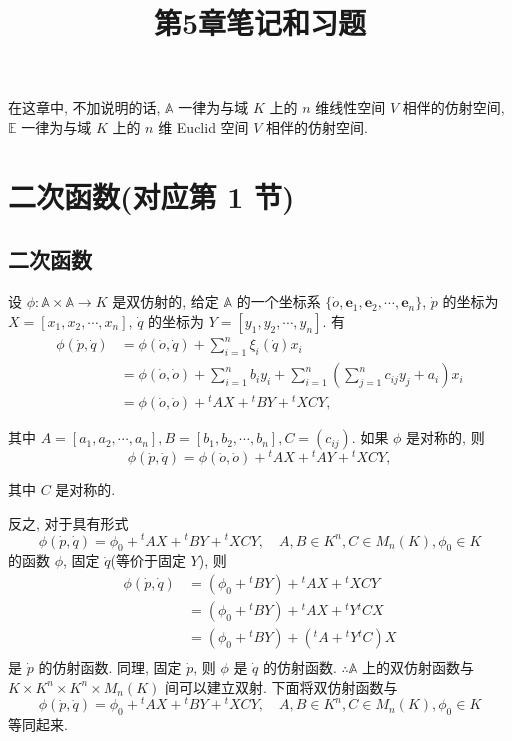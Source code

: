 \documentclass{ctexart}
\title{第5章笔记和习题}
\begin{document}
\maketitle
在这章中, 不加说明的话, $\mathbb{A}$ 一律为与域 $K$ 上的 $n$ 维线性空间 $V$ 相伴的仿射空间, $\mathbb{E}$ 一律为与域 $K$ 上的 $n$ 维 Euclid 空间 $V$ 相伴的仿射空间.
\section{二次函数(对应第 1 节)}
\subsection{二次函数}
设 $\phi:\mathbb{A}\times\mathbb{A}\to K$ 是双仿射的, 给定 $\mathbb{A}$ 的一个坐标系 $\{\dot{o},\boldsymbol{e}_1,\boldsymbol{e}_2,\cdots,\boldsymbol{e}_n\}$, $\dot{p}$ 的坐标为 $X=[x_1,x_2,\cdots,x_n]$, $\dot{q}$ 的坐标为 $Y=[y_1,y_2,\cdots,y_n]$. 有
\begin{align*}
    \phi(\dot{p},\dot{q}) & =\phi(\dot{o},\dot{q})+\sum\limits_{i=1}^n\xi_i(\dot{q})x_i \\
    & =\phi(\dot{o},\dot{o})+\sum\limits_{i=1}^nb_iy_i+\sum\limits_{i=1}^n\left(\sum\limits_{j=1}^nc_{ij}y_j+a_i\right)x_i \\
    & =\phi(\dot{o},\dot{o})+{}^tAX+{}^tBY+{}^tXCY,
\end{align*}

其中 $A=[a_1,a_2,\cdots,a_n],B=[b_1,b_2,\cdots,b_n],C=(c_{ij})$. 如果 $\phi$ 是对称的, 则
\[\phi(\dot{p},\dot{q})=\phi(\dot{o},\dot{o})+{}^tAX+{}^tAY+{}^tXCY,\]

其中 $C$ 是对称的.

反之, 对于具有形式
\[\phi(\dot{p},\dot{q})=\phi_0+{}^tAX+{}^tBY+{}^tXCY,\quad A,B\in K^n,C\in M_n(K),\phi_0\in K\]
的函数 $\phi$, 固定 $\dot{q}$(等价于固定 $Y$), 则
\begin{align*}
    \phi(\dot{p},\dot{q}) & =(\phi_0+{}^tBY)+{}^tAX+{}^tXCY \\
    & =(\phi_0+{}^tBY)+{}^tAX+{}^tY{}^tCX \\
    & =(\phi_0+{}^tBY)+({}^tA+{}^tY{}^tC)X \\
\end{align*}
是 $\dot{p}$ 的仿射函数. 同理, 固定 $\dot{p}$, 则 $\phi$ 是 $\dot{q}$ 的仿射函数. $\therefore\mathbb{A}$ 上的双仿射函数与 $K\times K^n\times K^n\times M_n(K)$ 间可以建立双射. 下面将双仿射函数与
\[\phi(\dot{p},\dot{q})=\phi_0+{}^tAX+{}^tBY+{}^tXCY,\quad A,B\in K^n,C\in M_n(K),\phi_0\in K\]
等同起来.
\end{document}
